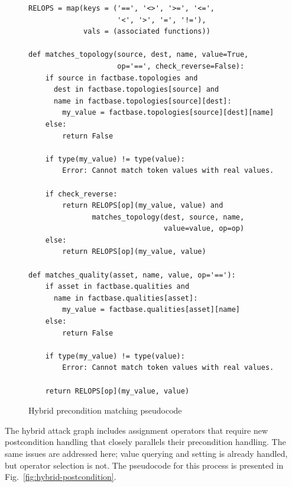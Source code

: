 \begin{figure}
\begin{lstlisting}
RELOPS = map(keys = ('==', '<>', '>=', '<=',
                     '<', '>', '=', '!='),
             vals = (associated functions))
             
def matches_topology(source, dest, name, value=True, 
                     op='==', check_reverse=False):
    if source in factbase.topologies and
      dest in factbase.topologies[source] and
      name in factbase.topologies[source][dest]:
        my_value = factbase.topologies[source][dest][name]
    else:
        return False

    if type(my_value) != type(value):
        Error: Cannot match token values with real values.
    
    if check_reverse:
        return RELOPS[op](my_value, value) and
               matches_topology(dest, source, name, 
                                value=value, op=op)
    else:
        return RELOPS[op](my_value, value)

def matches_quality(asset, name, value, op='=='):
    if asset in factbase.qualities and
      name in factbase.qualities[asset]:
        my_value = factbase.qualities[asset][name]
    else:
        return False
    
    if type(my_value) != type(value):
        Error: Cannot match token values with real values.
    
    return RELOPS[op](my_value, value)
\end{lstlisting}
\caption{Hybrid precondition matching pseudocode}
\label{fig:hybrid-matching}
\end{figure}
The hybrid attack graph includes assignment operators that require new
postcondition handling that closely parallels their precondition handling.
The same issues are addressed here; value querying and setting is already
handled, but operator selection is not. The pseudocode for this process is
presented in Fig.~\ref{fig:hybrid-postcondition}.

